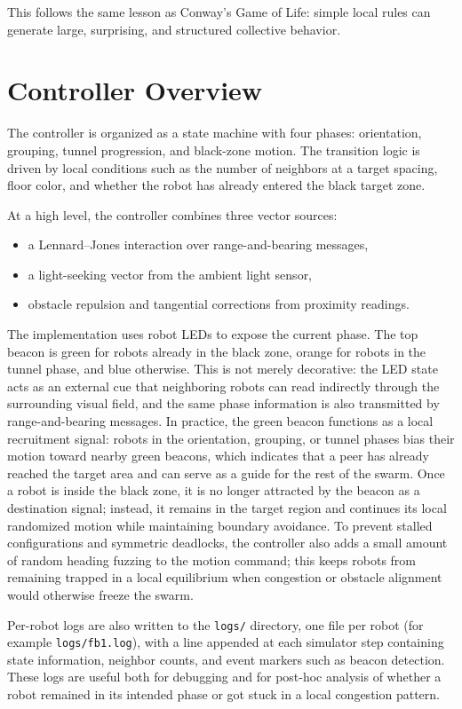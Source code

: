 \documentclass[runningheads]{llncs}
\begin{document}
This follows the same lesson as Conway's Game of Life: simple local rules can
generate large, surprising, and structured collective behavior.

\section{Controller Overview}
The controller is organized as a state machine with four phases: orientation,
grouping, tunnel progression, and black-zone motion. The transition logic is
driven by local conditions such as the number of neighbors at a target spacing,
floor color, and whether the robot has already entered the black target zone.

At a high level, the controller combines three vector sources:
\begin{itemize}
	\item a Lennard--Jones interaction over range-and-bearing messages,
	\item a light-seeking vector from the ambient light sensor,
	\item obstacle repulsion and tangential corrections from proximity readings.
\end{itemize}

The implementation uses robot LEDs to expose the current phase. The top beacon
is green for robots already in the black zone, orange for robots in the tunnel
phase, and blue otherwise. This is not merely decorative: the LED state acts as
an external cue that neighboring robots can read indirectly through the
surrounding visual field, and the same phase information is also transmitted by
range-and-bearing messages. In practice, the green beacon functions as a local
recruitment signal: robots in the orientation, grouping, or tunnel phases bias
their motion toward nearby green beacons, which indicates that a peer has already
reached the target area and can serve as a guide for the rest of the swarm.
Once a robot is inside the black zone, it is no longer attracted by the beacon as
a destination signal; instead, it remains in the target region and continues its
local randomized motion while maintaining boundary avoidance.
To prevent stalled configurations and symmetric deadlocks, the controller also
adds a small amount of random heading fuzzing to the motion command; this keeps
robots from remaining trapped in a local equilibrium when congestion or obstacle
alignment would otherwise freeze the swarm.

Per-robot logs are also written to the \texttt{logs/} directory, one file per
robot (for example \texttt{logs/fb1.log}), with a line appended at each
simulator step containing state information, neighbor counts, and event markers
such as beacon detection. These logs are useful both for debugging and for
post-hoc analysis of whether a robot remained in its intended phase or got
stuck in a local congestion pattern.
\end{document}
